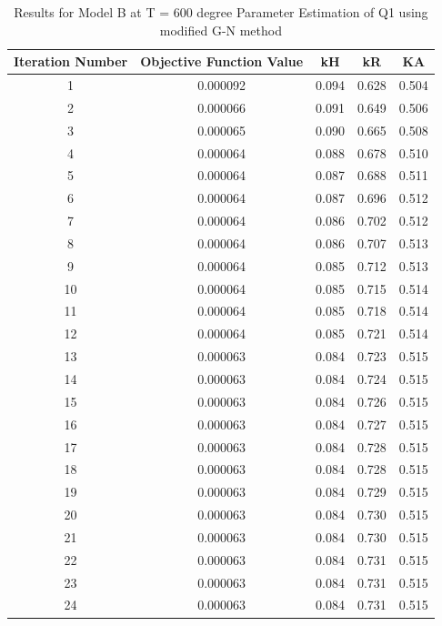 \documentclass[a4paper,12pt]{article} %
\begin{document}
\begin{table}[ht]
\begin{tabular}{|c|c|c|c|c|}
        \hline
\end{tabular}
\end{table}
    
\begin{table}[ht]
    \caption{Results for Model B at T = 600 degree Parameter Estimation of Q1 using modified G-N method}
    \centering
    \begin{tabular}{|c|c|c|c|c|}
        \hline
        Iteration Number & Objective Function Value & kH & kR & KA \\
        \hline   
        1 & 0.000092 & 0.094 & 0.628 & 0.504 \\
        2 & 0.000066 & 0.091 & 0.649 & 0.506 \\
        3 & 0.000065 & 0.090 & 0.665 & 0.508 \\
        4 & 0.000064 & 0.088 & 0.678 & 0.510 \\
        5 & 0.000064 & 0.087 & 0.688 & 0.511 \\
        6 & 0.000064 & 0.087 & 0.696 & 0.512 \\
        7 & 0.000064 & 0.086 & 0.702 & 0.512 \\
        8 & 0.000064 & 0.086 & 0.707 & 0.513 \\
        9 & 0.000064 & 0.085 & 0.712 & 0.513 \\
        10 & 0.000064 & 0.085 & 0.715 & 0.514 \\
        11 & 0.000064 & 0.085 & 0.718 & 0.514 \\
        12 & 0.000064 & 0.085 & 0.721 & 0.514 \\
        13 & 0.000063 & 0.084 & 0.723 & 0.515 \\
        14 & 0.000063 & 0.084 & 0.724 & 0.515 \\
        15 & 0.000063 & 0.084 & 0.726 & 0.515 \\
        16 & 0.000063 & 0.084 & 0.727 & 0.515 \\
        17 & 0.000063 & 0.084 & 0.728 & 0.515 \\
        18 & 0.000063 & 0.084 & 0.728 & 0.515 \\
        19 & 0.000063 & 0.084 & 0.729 & 0.515 \\
        20 & 0.000063 & 0.084 & 0.730 & 0.515 \\
        21 & 0.000063 & 0.084 & 0.730 & 0.515 \\
        22 & 0.000063 & 0.084 & 0.731 & 0.515 \\
        23 & 0.000063 & 0.084 & 0.731 & 0.515 \\
        24 & 0.000063 & 0.084 & 0.731 & 0.515 \\

\end{tabular}
\end{table}
\end{document}
